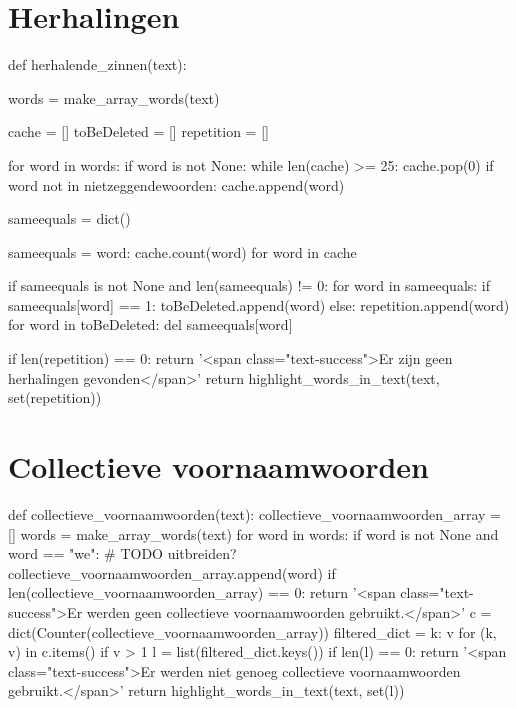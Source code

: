 \section{Herhalingen}
\label{bijlage:herhalingen}
\begin{python}
def herhalende_zinnen(text):

    words = make_array_words(text)

    cache = []
    toBeDeleted = []
    repetition = []

    for word in words:
        if word is not None:
            while len(cache) >= 25:
                cache.pop(0)
            if word not in nietzeggendewoorden:
                cache.append(word)

    sameequals = dict()

    sameequals = {word: cache.count(word) for word in cache}

    if sameequals is not None and len(sameequals) != 0:
        for word in sameequals:
            if sameequals[word] == 1:
                toBeDeleted.append(word)
            else:
                repetition.append(word)
        for word in toBeDeleted:
            del sameequals[word]

    if len(repetition) == 0:
        return '<span class="text-success">Er zijn geen herhalingen gevonden</span>'
    return highlight_words_in_text(text, set(repetition))
\end{python}

\section{Collectieve voornaamwoorden}
\label{bijlage:collectieve_voornaamwoorden}
\begin{python}
def collectieve_voornaamwoorden(text):
    collectieve_voornaamwoorden_array = []
    words = make_array_words(text)
    for word in words:
        if word is not None and word == "we":  # TODO uitbreiden?
            collectieve_voornaamwoorden_array.append(word)
    if len(collectieve_voornaamwoorden_array) == 0:
        return '<span class="text-success">Er werden geen collectieve voornaamwoorden gebruikt.</span>'
    c = dict(Counter(collectieve_voornaamwoorden_array))
    filtered_dict = {k: v for (k, v) in c.items() if v > 1}
    l = list(filtered_dict.keys())
    if len(l) == 0:
        return '<span class="text-success">Er werden niet genoeg collectieve voornaamwoorden gebruikt.</span>'
    return highlight_words_in_text(text, set(l))
\end{python}

